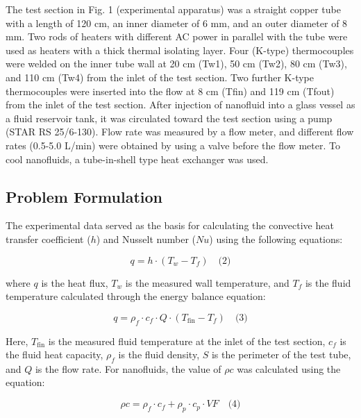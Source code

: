 \documentclass{article}
\begin{document}
The test section in Fig. 1 (experimental apparatus) was a straight copper tube with a length of 120 cm, an inner diameter of 6 mm, and an outer diameter of 8 mm. Two rods of heaters with different AC power in parallel with the tube were used as heaters with a thick thermal isolating layer. Four (K-type) thermocouples were welded on the inner tube wall at 20 cm (Tw1), 50 cm (Tw2), 80 cm (Tw3), and 110 cm (Tw4) from the inlet of the test section. Two further K-type thermocouples were inserted into the flow at 8 cm (Tfin) and 119 cm (Tfout) from the inlet of the test section. After injection of nanofluid into a glass vessel as a fluid reservoir tank, it was circulated toward the test section using a pump (STAR RS 25/6-130). Flow rate was measured by a flow meter, and different flow rates (0.5-5.0 L/min) were obtained by using a valve before the flow meter. To cool nanofluids, a tube-in-shell type heat exchanger was used.



\subsection{Problem Formulation}
The experimental data served as the basis for calculating the convective heat transfer coefficient ($h$) and Nusselt number ($Nu$) using the following equations:

\begin{equation}
q = h \cdot (T_w - T_f) \quad \text{(2)}
\end{equation}

where $q$ is the heat flux, $T_w$ is the measured wall temperature, and $T_f$ is the fluid temperature calculated through the energy balance equation:

\begin{equation}
q = \rho_f \cdot c_f \cdot Q \cdot (T_{\text{fin}} - T_f) \quad \text{(3)}
\end{equation}

Here, $T_{\text{fin}}$ is the measured fluid temperature at the inlet of the test section, $c_f$ is the fluid heat capacity, $\rho_f$ is the fluid density, $S$ is the perimeter of the test tube, and $Q$ is the flow rate. For nanofluids, the value of $\rho c$ was calculated using the equation:

\begin{equation}
\rho c = \rho_f \cdot c_f + \rho_p \cdot c_p \cdot VF \quad \text{(4)}
\end{equation}
\end{document}
